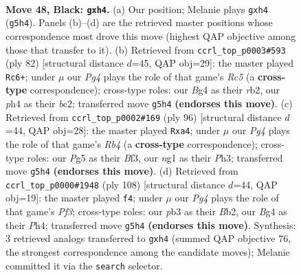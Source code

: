 \documentclass[11pt]{article}
\begin{document}
\clearpage

\begin{figure}[p]\centering
\begin{subfigure}{0.46\textwidth}\centering
\resizebox{\linewidth}{!}{%
\newchessgame
\chessboard[
  setfen={3k2B1/8/7r/6p1/1B3pbP/PP6/1K6/R5N1 b - - 0 48},
  showmover=false,
  pgfstyle=straightmove, color=movearrow, markmove={g5-h4}
]}
\caption{}
\end{subfigure}\hfill
\begin{subfigure}{0.46\textwidth}\centering
\resizebox{\linewidth}{!}{%
\newchessgame
\chessboard[
  setfen={8/7p/5kp1/2R5/P7/Rp4P1/1rb4P/4K3 w - - 6 42},
  showmover=false,
  pgfstyle=straightmove, color=movearrow, markmove={c5-c6}
]}
\caption{}
\end{subfigure}
\\[4pt]
\begin{subfigure}{0.46\textwidth}\centering
\resizebox{\linewidth}{!}{%
\newchessgame
\chessboard[
  setfen={2b5/7p/4prpk/2P5/pR6/5B1P/6P1/7K w - - 0 49},
  showmover=false,
  pgfstyle=straightmove, color=movearrow, markmove={b4-a4}
]}
\caption{}
\end{subfigure}\hfill
\begin{subfigure}{0.46\textwidth}\centering
\resizebox{\linewidth}{!}{%
\newchessgame
\chessboard[
  setfen={6k1/1p3r1p/2b3p1/8/2R3PP/4KP2/1B6/8 w - - 3 55},
  showmover=false,
  pgfstyle=straightmove, color=movearrow, markmove={f3-f4}
]}
\caption{}
\end{subfigure}
\caption{\textbf{Move 48, Black: \texttt{gxh4}.} (a) Our position; Melanie plays \texttt{gxh4} (\texttt{g5h4}). Panels (b)--(d) are the retrieved master positions whose correspondence most drove this move (highest QAP objective among those that transfer to it). (b) Retrieved from \texttt{ccrl\_top\_p0003\#593} (ply 82) [structural distance $d$=45, QAP obj=29]: the master played \texttt{Rc6+}; under $\mu$ our \emph{Pg4} plays the role of that game's \emph{Rc5} (a \textbf{cross-type} correspondence); cross-type roles: our \emph{B}g4 as their \emph{r}b2, our \emph{p}h4 as their \emph{b}c2; transferred move \texttt{g5h4} \textbf{(endorses this move)}. (c) Retrieved from \texttt{ccrl\_top\_p0002\#169} (ply 96) [structural distance $d$=44, QAP obj=28]: the master played \texttt{Rxa4}; under $\mu$ our \emph{Pg4} plays the role of that game's \emph{Rb4} (a \textbf{cross-type} correspondence); cross-type roles: our \emph{P}g5 as their \emph{B}f3, our \emph{n}g1 as their \emph{P}h3; transferred move \texttt{g5h4} \textbf{(endorses this move)}. (d) Retrieved from \texttt{ccrl\_top\_p0000\#1948} (ply 108) [structural distance $d$=44, QAP obj=19]: the master played \texttt{f4}; under $\mu$ our \emph{Pg4} plays the role of that game's \emph{Pf3}; cross-type roles: our \emph{p}b3 as their \emph{B}b2, our \emph{B}g4 as their \emph{P}h4; transferred move \texttt{g5h4} \textbf{(endorses this move)}. Synthesis: 3 retrieved analogs transferred to \texttt{gxh4} (summed QAP objective 76, the strongest correspondence among the candidate moves); Melanie committed it via the \texttt{search} selector.}
\label{fig:thought-m95}
\end{figure}
\end{document}
